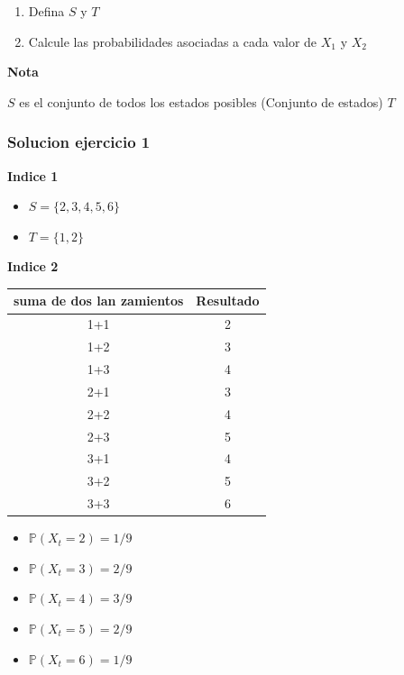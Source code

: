 \documentclass{article}
\begin{document}
\begin{enumerate}
    \item Defina \(S\) y \(T\)
    \item Calcule las probabilidades asociadas a cada valor de \(X_1\) y \(X_2\)
\end{enumerate}

\textbf{Nota}

$S$ es el conjunto de todos los estados posibles (Conjunto de estados)
$T$

\subsubsection{Solucion ejercicio 1}

\textbf{Indice 1}
\begin{itemize}
    \item \(S = \{2,3,4,5,6\}\)
    \item \(T = \{1,2\}\)
\end{itemize}

\textbf{Indice 2}

\begin{tabular}{c|c}
    suma de dos lan zamientos & Resultado \\
    \hline
    1+1                       & 2         \\
    1+2                       & 3         \\
    1+3                       & 4         \\
    2+1                       & 3         \\
    2+2                       & 4         \\
    2+3                       & 5         \\
    3+1                       & 4         \\
    3+2                       & 5         \\
    3+3                       & 6         \\
\end{tabular}

\begin{itemize}
    \item $\mathbb{P}(X_t = 2) = 1/9$
    \item $\mathbb{P}(X_t = 3) = 2/9$
    \item $\mathbb{P}(X_t = 4) = 3/9$
    \item $\mathbb{P}(X_t = 5) = 2/9$
    \item $\mathbb{P}(X_t = 6) = 1/9$
\end{itemize}
\end{document}
